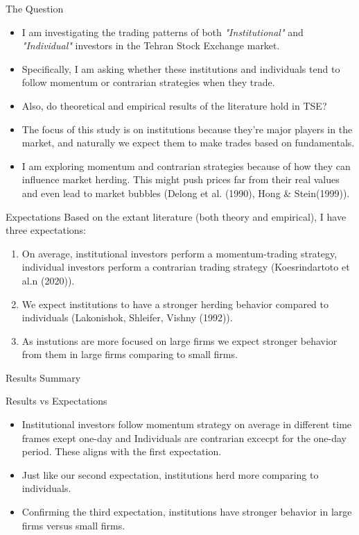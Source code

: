 \documentclass{beamer}
\begin{document}
\begin{frame}{The Question}
    \begin{itemize}
        \item I am investigating the trading patterns of both \emph{"Institutional"} and \emph{"Individual"} investors in the Tehran Stock Exchange market.
        \item Specifically, I am asking whether these institutions and individuals tend to follow momentum or contrarian strategies when they trade.
        \item Also, do theoretical and empirical results of the literature hold in TSE?
        \item The focus of this study is on institutions because they're major players in the market, and naturally we expect them to make trades based on fundamentals.
        \item I am exploring momentum and contrarian strategies because of how they can influence market herding. This might push prices far from their real values and even lead to market bubbles (Delong et al. (1990), Hong \& Stein(1999)).
    \end{itemize}
\end{frame}

\begin{frame}{Expectations}
    Based on the extant literature (both theory and empirical), I have three expectations:
    \begin{enumerate}
        \item On average, institutional investors perform a momentum-trading strategy, individual investors perform a contrarian trading strategy (Koesrindartoto et al.n (2020)).
        \item We expect institutions to have a stronger herding behavior compared to individuals (Lakonishok, Shleifer, Vishny (1992)).
        \item As instutions are more focused on large firms we expect stronger behavior from them in large firms comparing to small firms.
    \end{enumerate}
\end{frame}

\begin{frame}{Results Summary}
    \begin{block}{Results vs Expectations}
        \begin{itemize}
            \item Institutional investors follow momentum strategy on average in different time frames exept one-day and Individuals are contrarian excecpt for the one-day period. These aligns with the first expectation.
            \item Just like our second expectation, institutions herd more comparing to individuals.
            \item Confirming the third expectation, institutions have stronger behavior in large firms versus small firms.
        \end{itemize}
    \end{block}
\end{frame}
\end{document}
